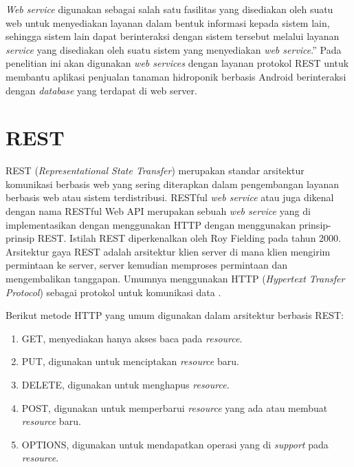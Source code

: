 \textit{Web service} digunakan sebagai salah satu fasilitas yang disediakan oleh suatu web untuk menyediakan layanan dalam bentuk informasi kepada sistem lain, sehingga sistem lain dapat berinteraksi dengan sistem tersebut melalui layanan \textit{service} yang disediakan oleh suatu sistem yang menyediakan \textit{web service}.” Pada penelitian ini akan digunakan \textit{web services} dengan layanan protokol REST untuk membantu aplikasi penjualan tanaman hidroponik berbasis Android berinteraksi dengan \textit{database} yang terdapat di web server.

\section{\uppercase{REST}}
REST (\textit{Representational State Transfer}) merupakan standar arsitektur komunikasi berbasis web yang sering diterapkan dalam pengembangan layanan berbasis web atau sistem terdistribusi. RESTful \textit{web service} atau juga dikenal dengan nama RESTful Web API merupakan sebuah \textit{web service} yang di implementasikan dengan menggunakan HTTP dengan menggunakan prinsip-prinsip REST. Istilah REST diperkenalkan oleh Roy Fielding pada tahun 2000. Arsitektur gaya REST adalah arsitektur klien server di mana klien mengirim permintaan ke server, server kemudian memproses permintaan dan mengembalikan tanggapan. Umumnya menggunakan HTTP (\textit{Hypertext Transfer Protocol}) sebagai protokol untuk komunikasi data \citep{saputra2018}.

\par Berikut metode HTTP yang umum digunakan dalam arsitektur berbasis REST:
\begin{enumerate}
	\item GET, menyediakan hanya akses baca pada \textit{resource}.
	\item PUT, digunakan untuk menciptakan \textit{resource} baru.
	\item DELETE, digunakan untuk menghapus \textit{resource}.
	\item POST, digunakan untuk memperbarui \textit{resource} yang ada atau membuat \textit{resource} baru.
	\item OPTIONS, digunakan untuk mendapatkan operasi yang di \textit{support} pada \textit{resource}.
\end{enumerate}

